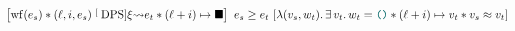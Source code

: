 \begin{theorem}
    \[
        \iCsimvHoare{
            \wf{e_s} \iSep
            (\loc, i, e_s) \tmcDps{\xi} e_t \iSep
            (\loc + i) \mapsto \lambdHole
        }{
            \lambdaAbs (v_s, w_t) \ldotp
            \exists v_t \ldotp
            w_t = \lambdUnit \iSep
            (\loc + i) \mapsto v_t \iSep
            v_s \iSimilar v_t
        }{
            e_s
        }{
            e_t
        }
    \]
\end{theorem}



%








